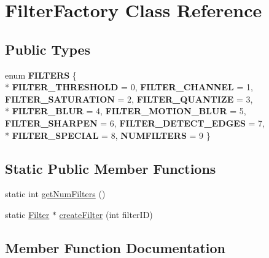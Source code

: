 \hypertarget{classFilterFactory}{}\section{Filter\+Factory Class Reference}
\label{classFilterFactory}
\subsection*{Public Types}
\begin{DoxyCompactItemize}
\item 
enum {\bfseries F\+I\+L\+T\+E\+RS} \{ \\*
{\bfseries F\+I\+L\+T\+E\+R\+\_\+\+T\+H\+R\+E\+S\+H\+O\+LD} = 0, 
{\bfseries F\+I\+L\+T\+E\+R\+\_\+\+C\+H\+A\+N\+N\+EL} = 1, 
{\bfseries F\+I\+L\+T\+E\+R\+\_\+\+S\+A\+T\+U\+R\+A\+T\+I\+ON} = 2, 
{\bfseries F\+I\+L\+T\+E\+R\+\_\+\+Q\+U\+A\+N\+T\+I\+ZE} = 3, 
\\*
{\bfseries F\+I\+L\+T\+E\+R\+\_\+\+B\+L\+UR} = 4, 
{\bfseries F\+I\+L\+T\+E\+R\+\_\+\+M\+O\+T\+I\+O\+N\+\_\+\+B\+L\+UR} = 5, 
{\bfseries F\+I\+L\+T\+E\+R\+\_\+\+S\+H\+A\+R\+P\+EN} = 6, 
{\bfseries F\+I\+L\+T\+E\+R\+\_\+\+D\+E\+T\+E\+C\+T\+\_\+\+E\+D\+G\+ES} = 7, 
\\*
{\bfseries F\+I\+L\+T\+E\+R\+\_\+\+S\+P\+E\+C\+I\+AL} = 8, 
{\bfseries N\+U\+M\+F\+I\+L\+T\+E\+RS} = 9
 \}\hypertarget{classFilterFactory_ad243abfbe26ac425470b5e7de220deb1}{}\label{classFilterFactory_ad243abfbe26ac425470b5e7de220deb1}

\end{DoxyCompactItemize}
\subsection*{Static Public Member Functions}
\begin{DoxyCompactItemize}
\item 
static int \hyperlink{classFilterFactory_a978466237a3acfbd5570fbf1d4dc1080}{get\+Num\+Filters} ()
\item 
static \hyperlink{classFilter}{Filter} $\ast$ \hyperlink{classFilterFactory_afa9986fc11ea262c26febc9191a19f47}{create\+Filter} (int filter\+ID)
\end{DoxyCompactItemize}


\subsection{Member Function Documentation}
